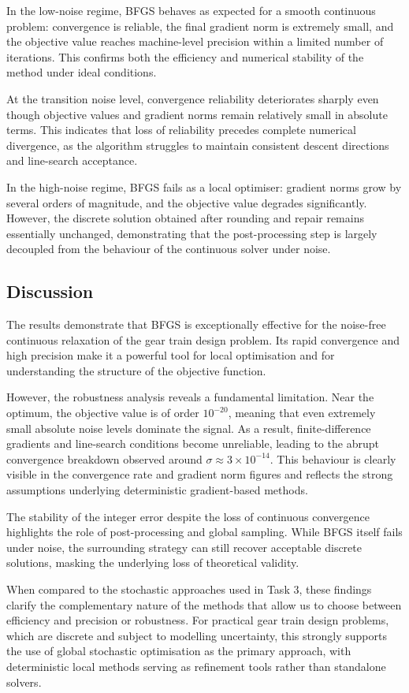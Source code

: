 In the low-noise regime, BFGS behaves as expected for a smooth continuous problem: convergence is reliable, the final gradient norm is extremely small, and the objective value reaches machine-level precision within a limited number of iterations. This confirms both the efficiency and numerical stability of the method under ideal conditions.

At the transition noise level, convergence reliability deteriorates sharply even though objective values and gradient norms remain relatively small in absolute terms. This indicates that loss of reliability precedes complete numerical divergence, as the algorithm struggles to maintain consistent descent directions and line-search acceptance.

In the high-noise regime, BFGS fails as a local optimiser: gradient norms grow by several orders of magnitude, and the objective value degrades significantly. However, the discrete solution obtained after rounding and repair remains essentially unchanged, demonstrating that the post-processing step is largely decoupled from the behaviour of the continuous solver under noise.

\subsection{Discussion}
The results demonstrate that BFGS is exceptionally effective for the noise-free continuous relaxation of the gear train design problem. Its rapid convergence and high precision make it a powerful tool for local optimisation and for understanding the structure of the objective function.

However, the robustness analysis reveals a fundamental limitation. Near the optimum, the objective value is of order $10^{-20}$, meaning that even extremely small absolute noise levels dominate the signal. As a result, finite-difference gradients and line-search conditions become unreliable, leading to the abrupt convergence breakdown observed around $\sigma \approx 3 \times 10^{-14}$. This behaviour is clearly visible in the convergence rate and gradient norm figures and reflects the strong assumptions underlying deterministic gradient-based methods.

The stability of the integer error despite the loss of continuous convergence highlights the role of post-processing and global sampling. While BFGS itself fails under noise, the surrounding strategy can still recover acceptable discrete solutions, masking the underlying loss of theoretical validity.

When compared to the stochastic approaches used in Task 3, these findings clarify the complementary nature of the methods that allow us to choose between efficiency and precision or robustness. For practical gear train design problems, which are discrete and subject to modelling uncertainty, this strongly supports the use of global stochastic optimisation as the primary approach, with deterministic local methods serving as refinement tools rather than standalone solvers.
